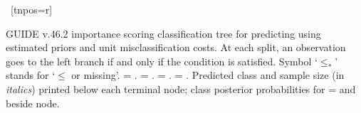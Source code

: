 \documentclass{article}
\begin{document}
\begin{landscape}
\begin{center}
{{{   }
   }
    ~[tnpos=r]{}
    ~{}
 }
 \end{center}
GUIDE v.46.2 importance scoring
classification tree for predicting \texttt{} using
estimated priors
and unit misclassification costs.
At each split, an observation goes to the left branch 
 if and only if the condition is satisfied.
 Symbol `$\leq_*$' stands for `$\leq$ or missing'.
\texttt{} = \texttt{}.
\texttt{} = \texttt{}.
\texttt{} = \texttt{}.
\texttt{} = \texttt{}.
Predicted class and sample size (in \emph{italics}) printed below each terminal node;
class posterior probabilities for \texttt{} =
 \texttt{} and \texttt{} beside node.
 \end{landscape}
 
\end{document}
